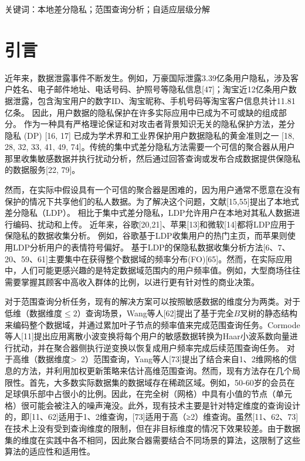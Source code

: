 关键词：本地差分隐私；范围查询分析；自适应层级分解

\section{引言} 
近年来，数据泄露事件不断发生。例如，万豪国际泄露3.39亿条用户隐私，涉及客户姓名、电子邮件地址、电话号码、护照号等隐私信息[47]；淘宝近12亿条用户数据泄露，包含淘宝用户的数字ID、淘宝昵称、手机号码等淘宝客户信息共计11.81亿条。 
因此，用户数据的隐私保护在许多实际应用中已成为不可或缺的组成部分。
作为一种具有严格理论保证和对攻击者背景知识无关的隐私保护方法，差分隐私 (DP) [16, 17] 已成为学术界和工业界保护用户数据隐私的黄金准则之一 [18, 28, 32, 33, 41, 49, 74]。传统的集中式差分隐私方法需要一个可信的聚合器从用户那里收集敏感数据并执行扰动分析，然后通过回答查询或发布合成数据提供保隐私的数据服务[22, 79]。

然而，在实际中假设具有一个可信的聚合器是困难的，因为用户通常不愿意在没有保护的情况下共享他们的私人数据。为了解决这个问题，文献[15,55]提出了本地式差分隐私（LDP）。
相比于集中式差分隐私，LDP允许用户在本地对其私人数据进行编码、扰动和上传。
近年来，谷歌[20,21]、苹果[13]和微软[14]都将LDP应用于保隐私的数据收集分析。
例如，谷歌基于LDP收集用户的热门主页，而苹果则使用LDP分析用户的表情符号偏好。
基于LDP的保隐私数据收集分析方法[6、7、20、59、61]主要集中在获得整个数据域的频率分布(FO)[65]。然而，在实际应用中，人们可能更感兴趣的是特定数据域范围内的用户频率值。例如，大型商场往往需要掌握其顾客中高收入群体的比例，以进行更有针对性的商业决策。

对于范围查询分析任务，现有的解决方案可以按照敏感数据的维度分为两类。对于低维（数据维度$\leq 2$）查询场景，Wang等人[62]提出了基于完全$B$叉树的静态结构来编码整个数据域，并通过累加叶子节点的频率值来完成范围查询任务。Cormode等人[11]提出应用离散小波变换将每个用户的敏感数据转换为Haar小波系数向量进行扰动，并在聚合器侧执行逆变换以恢复成用户频率完成后续范围查询任务。
对于高维（数据维度\textgreater~2）范围查询，Yang等人[73]提出了结合来自1、2维网格的信息的方法，并利用加权更新策略来估计高维范围查询。然而，现有方法存在几个局限性。首先，大多数实际数据集的数据域存在稀疏区域。例如，50-60岁的会员在足球俱乐部中占很小的比例。因此，在完全树（网格）中具有小值的节点（单元格）很可能会被注入的噪声淹没。此外，现有技术主要是针对特定维度的查询设计的，即[11、62]适用于1、2维查询，[73]适用于高（≥2）维查询。虽然[11、62、73]在技术上没有受到查询维度的限制，但在非目标维度的情况下效果较差。由于数据集的维度在实践中各不相同，因此聚合器需要结合不同场景的算法，这限制了这些算法的适应性和适用性。


